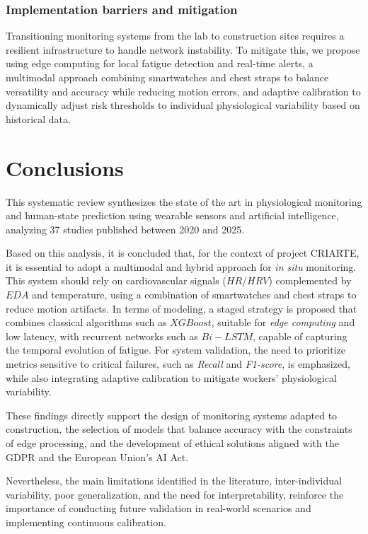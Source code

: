 \documentclass[runningheads]{llncs}
\newcommand{\criarteAcronym}{CRIARTE}
\begin{document}
\subsubsection*{Implementation barriers and mitigation}

Transitioning monitoring systems from the lab to construction sites requires a resilient infrastructure to handle network instability. To mitigate this, we propose using edge computing for local fatigue detection and real-time alerts, a multimodal approach combining smartwatches and chest straps to balance versatility and accuracy while reducing motion errors, and adaptive calibration to dynamically adjust risk thresholds to individual physiological variability based on historical data.

\section{Conclusions}

This systematic review synthesizes the state of the art in physiological monitoring and human-state prediction using wearable sensors and artificial intelligence, analyzing 37 studies published between 2020 and 2025.

Based on this analysis, it is concluded that, for the context of project \criarteAcronym, it is essential to adopt a multimodal and hybrid approach for \textit{in situ} monitoring. This system should rely on cardiovascular signals ($HR$/$HRV$) complemented by $EDA$ and temperature, using a combination of smartwatches and chest straps to reduce motion artifacts. In terms of modeling, a staged strategy is proposed that combines classical algorithms such as $XGBoost$, suitable for \textit{edge computing} and low latency, with recurrent networks such as $Bi-LSTM$, capable of capturing the temporal evolution of fatigue. For system validation, the need to prioritize metrics sensitive to critical failures, such as \textit{Recall} and \textit{F1-score}, is emphasized, while also integrating adaptive calibration to mitigate workers' physiological variability.

These findings directly support the design of monitoring systems adapted to construction, the selection of models that balance accuracy with the constraints of edge processing, and the development of ethical solutions aligned with the GDPR and the European Union's AI Act.

Nevertheless, the main limitations identified in the literature, inter-individual variability, poor generalization, and the need for interpretability, reinforce the importance of conducting future validation in real-world scenarios and implementing continuous calibration.
\end{document}
